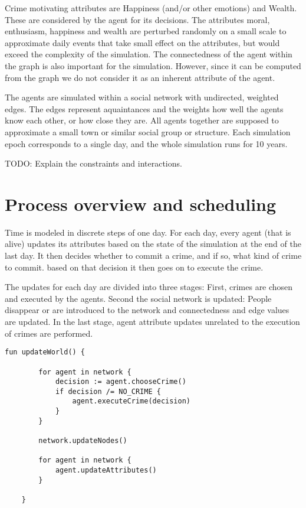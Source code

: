 \documentclass{article}
\begin{document}
		Crime motivating attributes are Happiness (and/or other emotions) and Wealth. These are
		considered by the agent for its decisions. The attributes
		moral, enthusiasm, happiness and wealth are perturbed randomly on a small scale to
		approximate daily events that take small effect on the attributes, but would exceed the
		complexity of the simulation.
		The connectedness of the agent within the graph is also important for the simulation.
		However, since it can be computed from the graph we do not consider it as an inherent
		attribute of the agent.
		\par
		The agents are simulated within a social network with undirected, weighted edges.
		The edges represent aquaintances and the weights how well the agents know each other,
		or how close they are.
		All agents together are supposed to approximate a small town or similar social group or
		structure. Each simulation epoch corresponds to a single day, and the whole simulation
		runs for 10 years.
		\\\par
		TODO: Explain the constraints and interactions.

	\section{Process overview and scheduling}
		Time is modeled in discrete steps of one day. For each day, every agent (that is alive)
		updates its attributes based on the state of the simulation at the end of the last day.
		It then decides whether to commit a crime, and if so, what kind of crime to commit. based
		on that decision it then goes on to execute the crime.
		\par
		The updates for each day are divided into three stages: First, crimes are chosen and
		executed by the agents. Second the social network is updated: People disappear or are
		introduced to the network and connectedness and edge values are updated. In the last
		stage, agent attribute updates unrelated to the execution of crimes are performed.

		\begin{lstlisting}[caption=The daily global update routine, label=l_global_update]
	fun updateWorld() {

		for agent in network {
			decision := agent.chooseCrime()
			if decision /= NO_CRIME {
				agent.executeCrime(decision)
			}
		}

		network.updateNodes()

		for agent in network {
			agent.updateAttributes()
		}

	}
		\end{lstlisting}
\end{document}
